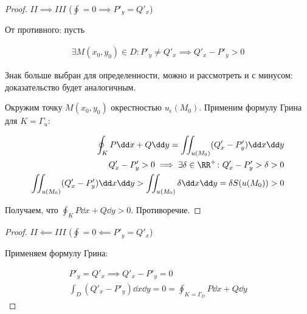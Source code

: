 \begin{proof}
  \(II \implies III\) (\(\oint = 0 \implies P'_{y} = Q'_{x}\))

  От противного: пусть

  \begin{align*}
    \exists M (x_{0}, y_{0}) \in D \colon P'_{y} \neq Q'_{x}
    \implies Q'_{x} - P'_{y} > 0
  \end{align*}

  Знак больше выбран для определенности, можно и рассмотреть и с минусом:
  доказательство будет аналогичным.

  Окружим точку \(M(x_{0}, y_{0})\) окрестностью \(u_{\epsilon}(M_{0})\).
  Применим формулу Грина для \(K = \Gamma_{u}\):

  \begin{align*}
    \oint_{K} P \dd x + Q \dd y
    = \iint_{u(M_{0})} (Q'_{x} - P'_{y}) \dd x \dd y \\
    Q'_{x} - P'_{y} > 0
      \implies \exists \delta \in \RR^{+} \colon Q'_{x} - P'_{y} > \delta > 0 \\
    \iint_{u(M_{0})} (Q'_{x} - P'_{y}) \dd x \dd y
      > \iint_{u(M_{0})} \delta \dd x \dd y
      = \delta S(u(M_{0})) > 0
  \end{align*}

  Получаем, что \(\oint_{K} P \dd x + Q \dd y > 0\). Противоречие.
\end{proof}
\begin{proof}
  \(II \impliedby III\) (\(\oint = 0 \impliedby P'_{y} = Q'_{x}\))

  Применяем формулу Грина:

  \begin{align*}
    P'_{y} = Q'_{x} \implies Q'_{x} - P'_{y} = 0 \\
      \int_{D} (Q'_{x} - P'_{y}) \dd x \dd y
      = 0
      = \oint_{K = \Gamma_{D}} P \dd x + Q \dd y
  \end{align*}
\end{proof}
